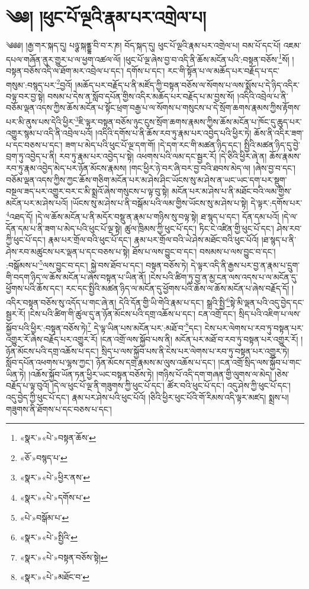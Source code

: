 \chapter{༄༅། །ཕུང་པོ་ལྔའི་རྣམ་པར་འགྲེལ་པ།}༄༅༅། །རྒྱ་གར་སྐད་དུ། པཉྩ་སྐནྡྷ་བི་བ་ར་ཎ། བོད་སྐད་དུ། ཕུང་པོ་ལྔའི་རྣམ་པར་འགྲེལ་པ། བམ་པོ་དང་པོ། འཇམ་དཔལ་གཞོན་ནུར་གྱུར་པ་ལ་ཕྱག་འཚལ་ལོ། །ཕུང་པོ་ལྔ་ཞེས་བྱ་བ་འདི་ནི་ཆོས་མངོན་པའི་:བསྟན་བཅོས་\footnote{«སྣར་»«པེ་»བསྟན་ཆོས་}སོ། །བསྟན་བཅོས་འདི་ལ་ཐོག་མར་འབྲེལ་པ་དང་། དགོས་པ་དང་། རང་གི་སྟོན་པ་ལ་མཆོད་པར་བརྗོད་པ་དང་གསུམ་:བསྙད་པར་\footnote{«ཅོ་»བསྙད་པ་}བྱའོ། །མཆོད་པར་བརྗོད་པ་ནི་མཛོད་ཀྱི་བསྟན་བཅོས་ལ་སོགས་པ་ལས་སྨོས་པ་དེ་ཉིད་འདིར་བལྟ་བར་བྱ་སྟེ། བསམ་པ་དེས་ན་སློབ་དཔོན་གྱིས་འདིར་མཆོད་པར་བརྗོད་པ་མ་བྱས་སོ། །འདིའི་འབྲེལ་པ་ནི་བཅོམ་ལྡན་འདས་ཀྱིས་ཆོས་མངོན་པ་སྟོང་ཕྲག་བརྒྱ་པ་ལ་སོགས་པ་གསུངས་པ་དེ་སྲོག་ཆགས་རྣམས་ཀྱིས་རྟོགས་པར་མི་ནུས་པས་དེའི་ཕྱིར་\footnote{«སྣར་»«པེ་»ཕྱིར་ནས་}ཇི་ལྟར་བསྟན་བཅོས་ཉུང་ངུས་སྲོག་ཆགས་རྣམས་ཀྱིས་ཆོས་མངོན་པ་ཁོང་དུ་ཆུད་པར་འགྱུར་སྙམ་པ་འདི་ནི་འབྲེལ་པའོ། །འདིའི་དགོས་པ་ནི་ཆོས་རབ་ཏུ་རྣམ་པར་འབྱེད་པའི་ཕྱིར་ཏེ། ཆོས་ནི་འདིར་ཟག་པ་དང་བཅས་པ་དང་། ཟག་པ་མེད་པའི་ཕུང་པོ་ལྔ་དག་གོ། །དེ་དག་རང་གི་མཚན་ཉིད་དང་། སྤྱིའི་མཚན་ཉིད་དུ་བྱེ་བྲག་ཏུ་འབྱེད་པ་ནི། རབ་ཏུ་རྣམ་པར་འབྱེད་པ་སྟེ། འཕགས་པའི་ལམ་དང་སྦྱར་རོ། །དེ་ཅིའི་ཕྱིར་ཞེ་ན། ཆོས་རྣམས་རབ་ཏུ་རྣམ་འབྱེད་མེད་པར་ཉོན་མོངས་རྣམས། །གང་ཕྱིར་ཉེ་བར་ཞི་བར་བྱ་བའི་ཐབས་མེད་ལ། །ཞེས་བྱ་བ་དང་། བཅོམ་ལྡན་འདས་ཀྱིས་ཀྱང་ཆོས་གཅིག་མངོན་པར་མ་ཤེས་ཤིང་ཡོངས་སུ་མ་ཤེས་ན་ཡང་ཡང་དག་པར་སྡུག་བསྔལ་ཟད་པར་འགྱུར་བར་ང་མི་སྨྲའོ་ཞེས་གསུངས་པ་ལྟ་བུ་སྟེ། མངོན་པར་མ་ཤེས་པ་ནི་མཐོང་བའི་ལམ་གྱིས་མངོན་པར་མ་ཤེས་པའོ། །ཡོངས་སུ་མ་ཤེས་པ་ནི་བསྒོམ་པའི་ལམ་གྱིས་ཡོངས་སུ་མ་ཤེས་པ་སྟེ། དེ་ལྟར་:དགོས་པར་\footnote{«སྣར་»«པེ་»དགོས་པ་}འཐད་དོ། །དེ་ལ་ཆོས་མངོན་པ་ནི་མདོར་བསྡུ་ན་རྣམ་པ་གཉིས་སུ་བལྟ་སྟེ། ཐ་སྙད་པ་དང་། དོན་དམ་པའོ། །དེ་ལ་དོན་དམ་པ་ནི་ཟག་པ་མེད་པའི་ཕུང་པོ་ལྔ་སྟེ། ཚུལ་ཁྲིམས་ཀྱི་ཕུང་པོ་དང་། ཏིང་ངེ་འཛིན་གྱི་ཕུང་པོ་དང་། ཤེས་རབ་ཀྱི་ཕུང་པོ་དང་། རྣམ་པར་གྲོལ་བའི་ཕུང་པོ་དང་། རྣམ་པར་གྲོལ་བའི་ཡེ་ཤེས་མཐོང་བའི་ཕུང་པོའོ། །ཐ་སྙད་པ་ནི་ཤེས་རབ་མཚུངས་པར་ལྡན་པ་དང་བཅས་པ་སྟེ། ཐོས་པ་ལས་བྱུང་བ་དང་། བསམས་པ་ལས་བྱུང་བ་དང་། :བསྒོམས་པ་\footnote{«པེ་»བསྒོམ་པ་}ལས་བྱུང་བ་དང་། སྐྱེ་བས་ཐོབ་པ་དང་། བསྟན་བཅོས་ཏེ། དེ་ལྟར་འདི་ནི་རྒྱས་པར་བྱ་ན་རྣམ་པ་དྲུག་གི་བདག་ཉིད་ལ་ཆོས་མངོན་པ་ཞེས་བསྟན་པ་ཡིན་ནོ། །ངེས་པའི་ཚིག་ཏུ་བྱ་ན་མྱ་ངན་ལས་འདས་པ་ལ་མངོན་དུ་ཕྱོགས་པའི་ཆོས་དང་། རང་དང་སྤྱིའི་མཚན་ཉིད་ལ་མངོན་དུ་ཕྱོགས་པའི་ཆོས་ལ་ཆོས་མངོན་པ་ཞེས་བརྗོད་དོ། །འདིར་བསྟན་བཅོས་སུ་འདོད་པ་གང་ཞེ་ན། དེའི་དོན་གྱི་ཡི་གེའི་རྣམ་པ་དང་། སྒྲའི་སྤྱི་\footnote{«སྣར་»«པེ་»སྤྱིའི་}སྟེ་མི་ལྡན་པའི་འདུ་བྱེད་དང་སྦྱར་རོ། །ངེས་པའི་ཚིག་གི་ཚུལ་དུ་ན་ཉོན་མོངས་པའི་དགྲ་འཆོས་པ་དང་། ངན་འགྲོ་དང་། སྲིད་པའི་འཇིག་པ་ལས་སྐྱོབ་པའི་ཕྱིར་:བསྟན་བཅོས་ཏེ།\footnote{«སྣར་»«པེ་»བསྟན་བཅོས་སྟེ།} དེ་ལྟ་ཡིན་པས་མངོན་པར་:མཐོ་བ་\footnote{«སྣར་»«པེ་»མཐོང་བ་}དང་། ངེས་པར་ལེགས་པ་རབ་ཏུ་བསྟན་པར་འགྱུར་རོ་ཞེས་བརྗོད་པར་འགྱུར་རོ། །ངན་འགྲོ་ལས་སྐྱོབ་པས་ནི། མངོན་པར་མཐོ་བ་རབ་ཏུ་བསྟན་པར་འགྱུར་རོ། །ཉོན་མོངས་པའི་དགྲ་འཆོས་པ་དང་། སྲིད་པ་ལས་སྐྱོབ་པས་ནི་ངེས་པར་ལེགས་པ་རབ་ཏུ་བསྟན་པར་འགྱུར་ཏེ། སློབ་དཔོན་འཕགས་པ་ལྷས་ཀྱང་། ཉོན་མོངས་དགྲ་རྣམས་མ་ལུས་འཆོས་པ་དང་། །ངན་འགྲོ་སྲིད་ལས་སྐྱོབ་པ་གང་ཡིན་ཏེ། །འཆོས་སྐྱོབ་ཡོན་ཏན་ཕྱིར་ཡང་བསྟན་བཅོས་ཏེ། །གཉིས་པོ་འདི་དག་གཞན་གྱི་ལུགས་ལ་མེད། །ཅེས་བརྗོད་པ་ལྟ་བུའོ། །དེ་ལ་ཕུང་པོ་ལྔ་ནི་གཟུགས་ཀྱི་ཕུང་པོ་དང་། ཚོར་བའི་ཕུང་པོ་དང་། འདུ་ཤེས་ཀྱི་ཕུང་པོ་དང་། འདུ་བྱེད་ཀྱི་ཕུང་པོ་དང་། རྣམ་པར་ཤེས་པའི་ཕུང་པོའོ། །ཅིའི་ཕྱིར་ཕུང་པོའི་གོ་རིམས་འདི་ལྟར་མཛད། སྨྲས་པ། གཟུགས་ནི་ཐོགས་པ་དང་བཅས་པ་དང་། 